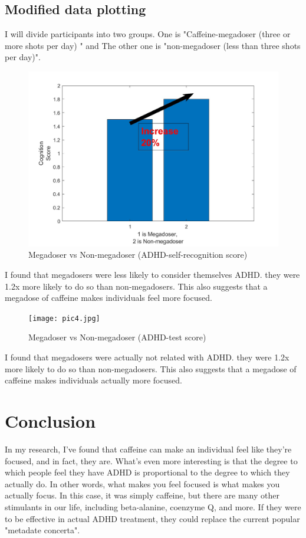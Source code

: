 \documentclass[12pt]{article}
\begin{document}
\subsection{Modified data plotting}
\quad I will divide participants into two groups. One is "Caffeine-megadoser (three or more shots per day) " and The other one is "non-megadoser (less than three shots per day)". 
\begin{figure}[h]
    \includegraphics[width = 12cm]{pic3.jpg}
    \centering
    \caption{Megadoser vs Non-megadoser (ADHD-self-recognition score)}
\end{figure}

\quad I found that megadosers were less likely to consider themselves ADHD. they were 1.2x more likely to do so than non-megadosers. This also suggests that a megadose of caffeine makes individuals feel more focused.

\begin{figure}[h]
    \texttt{[image: pic4.jpg]}
    \centering
    \caption{Megadoser vs Non-megadoser (ADHD-test score)}
\end{figure}

\quad I found that megadosers were actually not related with ADHD. they were 1.2x more likely to do so than non-megadosers. This also suggests that a megadose of caffeine makes individuals actually more focused.
\newpage
\section{Conclusion}
\quad In my research, I've found that caffeine can make an individual feel like they're focused, and in fact, they are. What's even more interesting is that the degree to which people feel they have ADHD is proportional to the degree to which they actually do. In other words, what makes you feel focused is what makes you actually focus. In this case, it was simply caffeine, but there are many other stimulants in our life, including beta-alanine, coenzyme Q, and more. If they were to be effective in actual ADHD treatment, they could replace the current popular "metadate concerta".
\end{document}
